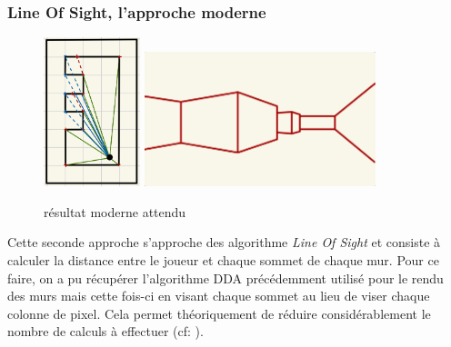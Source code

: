 \documentclass[11pt]{article}
\begin{document}
\subsubsection{Line Of Sight, l'approche moderne}

\begin{figure}
	\center
	\includegraphics[width=0.25\textwidth]{image/projection-2D-V2.jpeg}
	\raisebox{2cm}{
		\hspace{2mm}$\Longrightarrow$\hspace{2mm}
	}
	\includegraphics[width=0.6\textwidth]{image/rendu-sans-texture.jpeg}
	\caption{résultat moderne attendu}
	\label{fig:result-modern}
\end{figure}

Cette seconde approche s'approche des algorithme \textit{Line Of Sight} et consiste à calculer la distance entre le 
joueur et chaque sommet de chaque mur.
Pour ce faire, on a pu récupérer l'algorithme DDA précédemment utilisé pour le rendu des murs mais cette fois-ci 
en visant chaque sommet au lieu de viser chaque colonne de pixel. Cela permet théoriquement de réduire considérablement 
le nombre de calculs à effectuer (cf: ).
\end{document}
